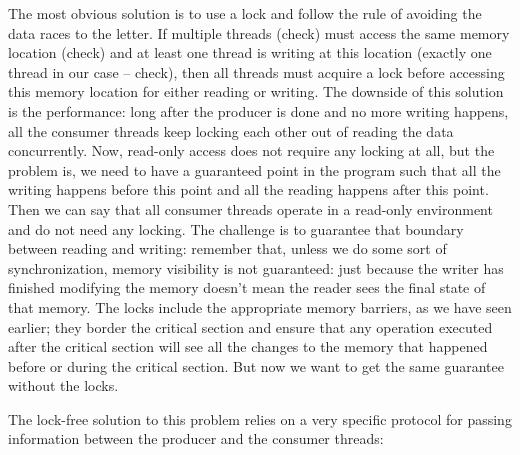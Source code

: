 The most obvious solution is to use a lock and follow the rule of avoiding the data races to the letter. If multiple threads (check) must access the same memory location (check) and at least one thread is writing at this location (exactly one thread in our case – check), then all threads must acquire a lock before accessing this memory location for either reading or writing. The downside of this solution is the performance: long after the producer is done and no more writing happens, all the consumer threads keep locking each other out of reading the data concurrently. Now, read-only access does not require any locking at all, but the problem is, we need to have a guaranteed point in the program such that all the writing happens before this point and all the reading happens after this point. Then we can say that all consumer threads operate in a read-only environment and do not need any locking. The challenge is to guarantee that boundary between reading and writing: remember that, unless we do some sort of synchronization, memory visibility is not guaranteed: just because the writer has finished modifying the memory doesn't mean the reader sees the final state of that memory. The locks include the appropriate memory barriers, as we have seen earlier; they border the critical section and ensure that any operation executed after the critical section will see all the changes to the memory that happened before or during the critical section. But now we want to get the same guarantee without the locks.

The lock-free solution to this problem relies on a very specific protocol for passing information between the producer and the consumer threads:

